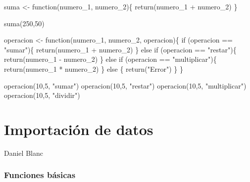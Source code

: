 \documentclass[
  letterpaper,
  DIV=11,
  numbers=noendperiod]{scrreprt}
\newenvironment{Shaded}{\begin{snugshade}}{\end{snugshade}}
\newcommand{\ControlFlowTok}[1]{\textcolor[rgb]{0.00,0.23,0.31}{#1}}
\newcommand{\DecValTok}[1]{\textcolor[rgb]{0.68,0.00,0.00}{#1}}
\newcommand{\FunctionTok}[1]{\textcolor[rgb]{0.28,0.35,0.67}{#1}}
\newcommand{\NormalTok}[1]{\textcolor[rgb]{0.00,0.23,0.31}{#1}}
\newcommand{\OtherTok}[1]{\textcolor[rgb]{0.00,0.23,0.31}{#1}}
\newcommand{\SpecialCharTok}[1]{\textcolor[rgb]{0.37,0.37,0.37}{#1}}
\newcommand{\StringTok}[1]{\textcolor[rgb]{0.13,0.47,0.30}{#1}}
\begin{document}
\begin{Shaded}
\begin{Highlighting}[]
\NormalTok{suma }\OtherTok{\textless{}{-}} \ControlFlowTok{function}\NormalTok{(numero\_1, numero\_2)\{}
  \FunctionTok{return}\NormalTok{(numero\_1 }\SpecialCharTok{+}\NormalTok{ numero\_2)}
\NormalTok{\}}

\FunctionTok{suma}\NormalTok{(}\DecValTok{250}\NormalTok{,}\DecValTok{50}\NormalTok{)}

\NormalTok{operacion }\OtherTok{\textless{}{-}} \ControlFlowTok{function}\NormalTok{(numero\_1, numero\_2, operacion)\{}
  \ControlFlowTok{if}\NormalTok{ (operacion }\SpecialCharTok{==} \StringTok{"sumar"}\NormalTok{)\{}
    \FunctionTok{return}\NormalTok{(numero\_1 }\SpecialCharTok{+}\NormalTok{ numero\_2)}
\NormalTok{  \} }\ControlFlowTok{else} \ControlFlowTok{if}\NormalTok{ (operacion }\SpecialCharTok{==} \StringTok{"restar"}\NormalTok{)\{}
    \FunctionTok{return}\NormalTok{(numero\_1 }\SpecialCharTok{{-}}\NormalTok{ numero\_2)}
\NormalTok{  \} }\ControlFlowTok{else} \ControlFlowTok{if}\NormalTok{ (operacion }\SpecialCharTok{==} \StringTok{"multiplicar"}\NormalTok{)\{}
    \FunctionTok{return}\NormalTok{(numero\_1 }\SpecialCharTok{*}\NormalTok{ numero\_2)}
\NormalTok{  \} }\ControlFlowTok{else}\NormalTok{ \{}
    \FunctionTok{return}\NormalTok{(}\StringTok{"Error"}\NormalTok{)}
\NormalTok{  \}}
\NormalTok{\}}

\FunctionTok{operacion}\NormalTok{(}\DecValTok{10}\NormalTok{,}\DecValTok{5}\NormalTok{, }\StringTok{"sumar"}\NormalTok{)}
\FunctionTok{operacion}\NormalTok{(}\DecValTok{10}\NormalTok{,}\DecValTok{5}\NormalTok{, }\StringTok{"restar"}\NormalTok{)}
\FunctionTok{operacion}\NormalTok{(}\DecValTok{10}\NormalTok{,}\DecValTok{5}\NormalTok{, }\StringTok{"multiplicar"}\NormalTok{)}
\FunctionTok{operacion}\NormalTok{(}\DecValTok{10}\NormalTok{,}\DecValTok{5}\NormalTok{, }\StringTok{"dividir"}\NormalTok{)}
\end{Highlighting}
\end{Shaded}


\hypertarget{importaciuxf3n-de-datos}{%
\chapter{Importación de datos}\label{importaciuxf3n-de-datos}}

Daniel Blanc

\hfill\break

\hypertarget{funciones-buxe1sicas}{%
\subsection{Funciones básicas}\label{funciones-buxe1sicas}}
\end{document}
